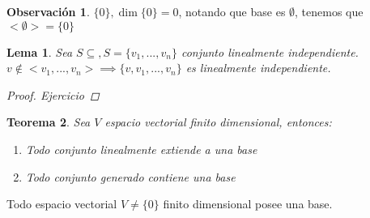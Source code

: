 \documentclass[11pt]{book}
\newtheorem{thm}{Teorema}[section]
\newtheorem{lem}[thm]{Lema}
\theoremstyle{definition}
\newtheorem{obs}{Observación}[section]
\begin{document}
\begin{obs}
$\{0\}, \dim\{0\}=0$, notando que base es $\emptyset$, tenemos que $<\emptyset>=\{0\}$
\end{obs}
\begin{lem}
Sea $S\subseteq , S=\{v_1,...,v_n\}$ conjunto linealmente independiente.\\
$v\notin<v_1,...,v_n>\implies\{v,v_1,...,v_n\}$ es linealmente independiente.
\begin{proof}
Ejercicio
\end{proof}
\end{lem}

\begin{thm}
Sea $V$ espacio vectorial finito dimensional, entonces:
\begin{enumerate}
	\item Todo conjunto linealmente extiende a una base
	
	\item Todo conjunto generado contiene una base
\end{enumerate}

\end{thm}
Todo espacio vectorial $V\neq\{0\}$ finito dimensional posee una base.
\end{document}
